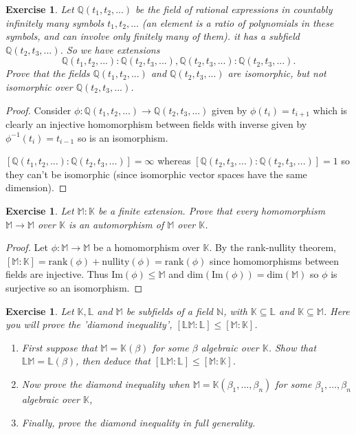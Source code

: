 \documentclass{article}
\newtheorem{exercise}[theorem]{Exercise}
\begin{document}
\begin{exercise}
Let $\mathbb{Q}(t_1,t_2,...)$ be the field of rational expressions in countably infinitely many symbols $t_1,t_2,...$ (an element is a ratio of polynomials in these symbols, and can involve only finitely many of them). it has a subfield $\mathbb{Q}(t_2,t_3,...)$. So we have extensions\[\mathbb{Q}(t_1,t_2,...):\mathbb{Q}(t_2,t_3,...),\mathbb{Q}(t_2,t_3,...):\mathbb{Q}(t_2,t_3,...).\]Prove that the fields $\mathbb{Q}(t_1,t_2,...)$ and $\mathbb{Q}(t_2,t_3,...)$ are isomorphic, but not isomorphic over $\mathbb{Q}(t_2,t_3,...)$.
\end{exercise}
\begin{proof}
Consider $\phi:\mathbb{Q}(t_1,t_2,...)\to\mathbb{Q}(t_2,t_3,...)$ given by $\phi(t_i)=t_{i+1}$ which is clearly an injective homomorphism between fields with inverse given by $\phi^{-1}(t_i)=t_{i-1}$ so is an isomorphism.

$[\mathbb{Q}(t_1,t_2,...):\mathbb{Q}(t_2,t_3,...)]=\infty$ whereas $[\mathbb{Q}(t_2,t_3,...):\mathbb{Q}(t_2,t_3,...)]=1$ so they can't be isomorphic (since isomorphic vector spaces have the same dimension).
\end{proof}

\begin{exercise}
Let $\mathbb{M}:\mathbb{K}$ be a finite extension. Prove that every homomorphism $\mathbb{M}\to\mathbb{M}$ over $\mathbb{K}$ is an automorphism of $\mathbb{M}$ over $\mathbb{K}$.
\end{exercise}
\begin{proof}
Let $\phi:\mathbb{M}\to\mathbb{M}$ be a homomorphism over $\mathbb{K}$. By the rank-nullity theorem, $[\mathbb{M}:\mathbb{K}]=\text{rank}(\phi)+\text{nullity}(\phi)=\text{rank}(\phi)$ since homomorphisms between fields are injective. Thus $\text{Im}(\phi)\leqslant \mathbb{M}$ and $\text{dim}(\text{Im}(\phi))=\text{dim}(\mathbb{M})$ so $\phi$ is surjective so an isomorphism.
\end{proof}

\begin{exercise}
Let $\mathbb{K},\mathbb{L}$ and $\mathbb{M}$ be subfields of a field $\mathbb{N}$, with $\mathbb{K}\subseteq\mathbb{L}$ and $\mathbb{K}\subseteq\mathbb{M}$. Here you will prove the 'diamond inequality', $[\mathbb{L}\mathbb{M}:\mathbb{L}]\leq[\mathbb{M}:\mathbb{K}]$.
\begin{enumerate}[label=(\roman*)]
    \item First suppose that $\mathbb{M}=\mathbb{K}(\beta)$ for some $\beta$ algebraic over $\mathbb{K}$. Show that $\mathbb{L}\mathbb{M}=\mathbb{L}(\beta)$, then deduce that $[\mathbb{L}\mathbb{M}:\mathbb{L}]\leq[\mathbb{M}:\mathbb{K}]$.
    \item Now prove the diamond inequality when $\mathbb{M}=\mathbb{K}(\beta_1,...,\beta_n)$ for some $\beta_1,...,\beta_n$ algebraic over $\mathbb{K}$,
    \item Finally, prove the diamond inequality in full generality.
\end{enumerate}
\end{exercise}
\end{document}
